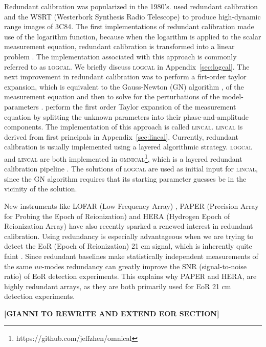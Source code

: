 \documentclass[useAMS,usenatbib]{mn2e}
\begin{document}
Redundant calibration was popularized in the 1980's. \citet{Noordam1982} used redundant calibration and the WSRT (Westerbork Synthesis Radio Telescope) to produce high-dynamic range images of 3C84.
The first implementations of redundant calibration made use of the logarithm function, because when the logarithm is applied to the scalar measurement equation, redundant 
calibration is transformed into a linear problem \citep{Wieringa1992,Camps2003,Liu2010}. The implementation associated with this approach is commonly referred to as \textsc{logcal}.
We briefly discuss \textsc{logcal} in Appendix~\ref{sec:logcal}. The next improvement in redundant calibration was to perform a firt-order taylor expansion, which is equivalent to the Gauss-Newton (GN) algorithm \citep{Kurien2016}, of the measurement equation and then to solve for the
perturbations of the model-parameters \citep{Liu2010}. \citet{Liu2010} perform the first order Taylor expansion of the measurement equation by splitting the unknown parameters into their phase-and-amplitude
components. The implementation of  this approach is called \textsc{lincal}. \textsc{lincal} is derived from first principals in Appendix~\ref{sec:lincal}. 
Currently, redundant calibration is usually implemented using a layered algorithmic strategy. \textsc{logcal} and \textsc{lincal} are both implemented in \textsc{omnical}\footnote{https://github.com/jeffzhen/omnical}, which is a layered redundant calibration pipeline \citep{Zheng2014,Ali2015}.
The solutions of \textsc{logcal} are used as initial input for \textsc{lincal}, since the GN algorithm requires that its starting parameter guesses be in the vicinity 
of the solution.

New instruments like LOFAR (Low Frequency Array) \citep{Noorishad2012}, PAPER (Precision Array for Probing the Epoch of Reionization) \citep{Ali2015} and HERA (Hydrogen Epoch of Reionization Array) \citep{deboer2015} have also recently sparked a renewed interest in redundant calibration. Using redundancy is especially advantageous when we are trying to detect the EoR (Epoch of Reionization) 21 cm signal,
which is inherently quite faint \citep{Parsons2012}. Since redundant baselines make statistically independent measurements of the same $uv$-modes redundancy can greatly 
improve the SNR (signal-to-noise ratio) of EoR detection experiments. This explains why PAPER and HERA, are highly redundant arrays, as they are both primarily used for EoR 21 cm detection experiments.

\noindent
\textbf{[GIANNI TO REWRITE AND EXTEND EOR SECTION]}
\end{document}

